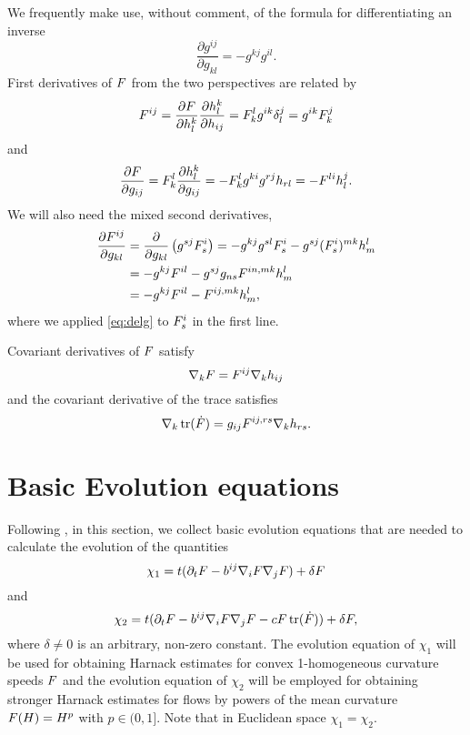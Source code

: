 \documentclass{amsart}
\begin{document}
We frequently make use, without comment, of the formula for differentiating an inverse
\[
\frac{\partial g^{ij}}{\partial g_{kl}} = - g^{kj} g^{il}.
\]
First derivatives of \(F\) from the two perspectives are related by
\begin{equation}
\label{eq:delh}
F^{ij} = \frac{\partial F}{\partial h_l^k} \frac{\partial h_l^k}{\partial h_{ij}} = F^l_k g^{ik} \delta^j_l = g^{ik} F^j_k
\end{equation}
and
\begin{equation}
\label{eq:delg}
\frac{\partial F}{\partial g_{ij}} = F^{l}_{k} \frac{\partial h^{k}_{l}}{\partial g_{ij}} = -F^{l}_{k} g^{ki} g^{rj} h_{rl} = -F^{li}h^{j}_{l}.
\end{equation}
We will also need the mixed second derivatives,
\begin{equation}
\label{eq:delhdelg}
\begin{split}
\frac{\partial F^{ij}}{\partial g_{kl}} &= \frac{\partial}{\partial g_{kl}} \left(g^{sj} F^{i}_{s} \right) = - g^{kj}g^{sl} F^{i}_{s} - g^{sj} (F^i_s)^{mk} h^l_m \\
&= - g^{kj} F^{il} - g^{sj} g_{ns} F^{in,mk} h^l_m \\
&= - g^{kj} F^{il} - F^{ij,mk} h^l_m,
\end{split}
\end{equation}
where we applied \eqref{eq:delg} to \(F^i_s\) in the first line.

Covariant derivatives of \(F\) satisfy
\begin{equation}
\label{eq:delphi}
\nabla_k F = F^{ij} \nabla_k h_{ij}
\end{equation}
and the covariant derivative of the trace satisfies
\begin{equation}
\label{eq:delPhi}
\nabla_k \operatorname{tr}(\dot{F}) = g_{ij} F^{ij,rs} \nabla_k h_{rs}.
\end{equation}

\section{Basic Evolution equations}
\label{sec:basic_evolution}

Following \cite{Andrews:09/1994, Chow:06/1991, Hamilton:/1995, Smoczyk:/1997}, in this section, we collect basic evolution equations that are needed to calculate the evolution of the quantities
\[
\chi_1 =t(\partial_t F- b^{ij} \nabla_i F \nabla_j F) +\delta F
\]
and
\[
\chi_2 =t(\partial_t F - b^{ij} \nabla_i F \nabla_j F - c F \operatorname{tr}(\dot{F})) +\delta F,
\]
where \(\delta \ne 0\) is an arbitrary, non-zero constant. The evolution equation of $\chi_1$ will be used for obtaining Harnack estimates for convex 1-homogeneous curvature speeds $F$ and the evolution equation of $\chi_2$ will be employed for obtaining stronger Harnack estimates for flows by powers of the mean curvature $F(H)=H^{p}$ with $p\in(0,1].$ Note that in Euclidean space $\chi_1=\chi_2.$
\end{document}
